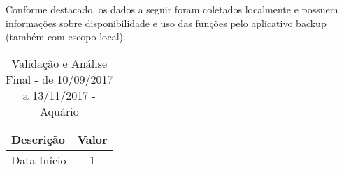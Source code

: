 Conforme destacado, os dados a seguir foram coletados localmente e possuem informações sobre disponibilidade e uso das funções pelo aplicativo backup (também com escopo local).

\begin{table}[hbp]
    \caption{Validação e Análise Final - de 10/09/2017 a 13/11/2017 - Aquário}
    \begin{tabular}{lc}
        \toprule
        \textbf{Descrição} & \textbf{Valor} \\
        \midrule
        Data Início                               				& 1                  \\
    \end{tabular}
\end{table}
